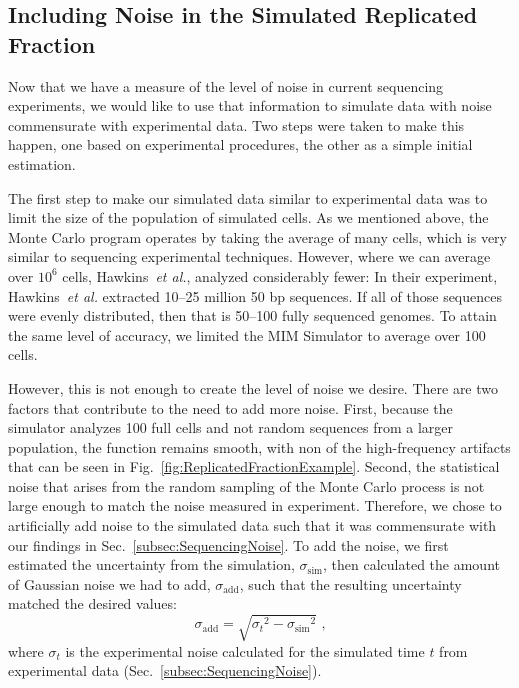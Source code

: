 		
		\subsection{Including Noise in the Simulated Replicated Fraction}
		\label{subsec:IncludingNoise}
		
		Now that we have a measure of the level of noise in current sequencing experiments, we would like to use that information to simulate data with noise commensurate with experimental data.
		Two steps were taken to make this happen, one based on experimental procedures, the other as a simple initial estimation.
		
		The first step to make our simulated data similar to experimental data was to limit the size of the population of simulated cells.
		As we mentioned above, the Monte Carlo program operates by taking the average of many cells, which is very similar to sequencing experimental techniques.
		However, where we can average over $10^6$ cells, Hawkins~\emph{et al.}, analyzed considerably fewer:
		In their experiment, Hawkins~\emph{et al.} extracted 10--25 million 50 bp sequences.
		If all of those sequences were evenly distributed, then that is 50--100 fully sequenced genomes.
		To attain the same level of accuracy, we limited the MIM Simulator to average over 100 cells.
		
		However, this is not enough to create the level of noise we desire.
		There are two factors that contribute to the need to add more noise.
		First, because the simulator analyzes 100 full cells and not random sequences from a larger population, the function remains smooth, with non of the high-frequency artifacts that can be seen in Fig.~\ref{fig:ReplicatedFractionExample}.
		Second, the statistical noise that arises from the random sampling of the Monte Carlo process is not large enough to match the noise measured in experiment.
		Therefore, we chose to artificially add noise to the simulated data such that it was commensurate with our findings in Sec.~\ref{subsec:SequencingNoise}.
		To add the noise, we first estimated the uncertainty from the simulation, $\sigma_\text{sim}$, then calculated the amount of Gaussian noise we had to add, $\sigma_\text{add}$, such that the resulting uncertainty matched the desired values:
		\begin{equation}
			\sigma_\text{add} = \sqrt{{\sigma_t}^2 - {\sigma_\text{sim}}^2} \text{ ,}
		\end{equation}
		where $\sigma_t$ is the experimental noise calculated for the simulated time $t$ from experimental data (Sec.~\ref{subsec:SequencingNoise}).
		
